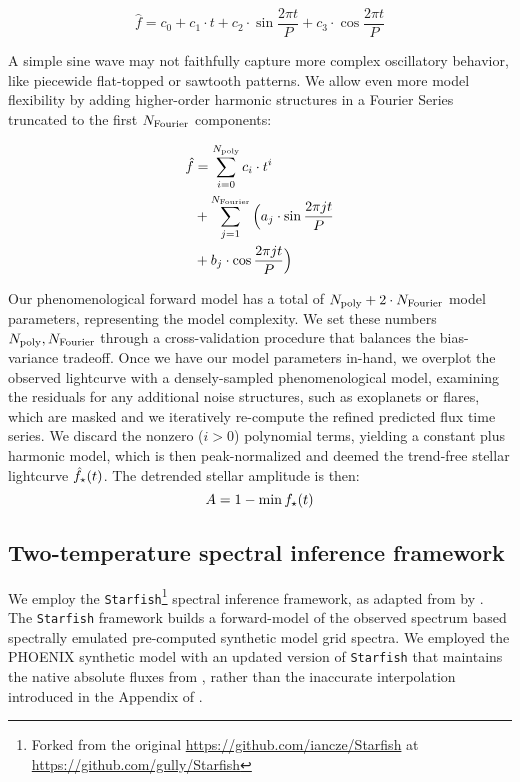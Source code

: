 \documentclass[revtex4]{emulateapj}%
\begin{document}
\begin{equation}
\hat f = c_0 + c_1 \cdot t + c_2 \cdot \sin{\frac{2\pi t}{P}} + c_3 \cdot \cos{\frac{2\pi t}{P}}
\end{equation}

A simple sine wave may not faithfully capture more complex oscillatory behavior, like piecewide flat-topped or sawtooth patterns.  We allow even more model flexibility by adding higher-order harmonic structures in a Fourier Series \citep{vanderplas15a} truncated to the first $N_{\rm Fourier}$ components:

\begin{equation} \label{eqn:Fourier}
  \begin{split}
 \hat f  & =  \sum_{i=0}^{N_{\rm poly}} c_i \cdot t^i \\
         & + \sum_{j=1}^{N_{\rm Fourier}} \Big( a_j \cdot \sin{\frac{2\pi j t}{P}} \\
         & + b_j \cdot \cos{\frac{2\pi j t}{P}} \Big)
\end{split}
\end{equation}

Our phenomenological forward model has a total of $N_{\rm poly}+2 \cdot N_{\rm Fourier}$ model parameters, representing the model complexity.  We set these numbers $N_{\rm poly}, N_{\rm Fourier}$ through a cross-validation procedure that balances the bias-variance tradeoff.  Once we have our model parameters in-hand, we overplot the observed lightcurve with a densely-sampled phenomenological model, examining the residuals for any additional noise structures, such as exoplanets or flares, which are masked and we iteratively re-compute the refined predicted flux time series.  We discard the nonzero ($i>0$) polynomial terms, yielding a constant plus harmonic model, which is then peak-normalized and deemed the trend-free stellar lightcurve $\hat f_{\rm \star}(t)$.  The detrended stellar amplitude is then: $$ A = 1 - \min{f_{\rm \star}(t)}$$

\subsection{Two-temperature spectral inference framework}

We employ the \texttt{Starfish}\footnote{Forked from the original \url{https://github.com/iancze/Starfish} at \url{https://github.com/gully/Starfish}} \citep{czekala15} spectral inference framework, as adapted from  by \citet{2017ApJ...836..200G}.  The \texttt{Starfish} framework builds a forward-model of the observed spectrum based spectrally emulated pre-computed synthetic model grid spectra.  We employed the PHOENIX synthetic model with an updated version of \texttt{Starfish} that maintains the native absolute fluxes from \citet{husser13}, rather than the inaccurate interpolation introduced in the Appendix of \citet{2017ApJ...836..200G}.
\end{document}
